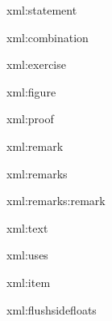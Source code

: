 \startxmlsetups xml:statement
%
\stopxmlsetups

\startxmlsetups xml:combination
%
\stopxmlsetups

\startxmlsetups xml:exercise
\stopxmlsetups

\startxmlsetups xml:figure
\stopxmlsetups

\startxmlsetups xml:proof
\stopxmlsetups

\startxmlsetups xml:remark
\stopxmlsetups

\startxmlsetups xml:remarks 
{\tenpoint{}%
%
\stopitemize}%
\stopxmlsetups

\startxmlsetups xml:remarks:remark
\item{}%
\stopxmlsetups

\startxmlsetups xml:text

%
\stopxmlsetups

\startxmlsetups xml:uses
{\tenpoint
{}
%
\stopitemize}
\stopxmlsetups

\startxmlsetups xml:item
%
\stopxmlsetups

\startxmlsetups xml:flushsidefloats
\flushsidefloats
\stopxmlsetups

\def\setupCourse#1{\ctxlua{L.setCourse("#1")}}
\def\completeRecords{\ctxlua{L.showRecords()}}%
\def\completeFiches{\ctxlua{L.showFiches()}}%
\protect
\stopenvironment
